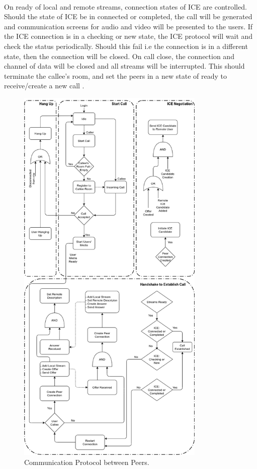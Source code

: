 \\On ready of local and remote streams, connection states of ICE are controlled. Should the state of ICE be in connected or completed, the call will be generated  and communication screens for audio and video will be presented to the users. If the ICE connection is in a checking or new state, the ICE protocol will wait and check the status periodically. Should this fail i.e the connection is in a different state, then the connection will be closed.
On call close, the connection and channel of data will be closed and all streams will be interrupted. This should terminate the callee’s room, and set the peers in a new state of ready to receive/create a new call \cite{14003034520191201}.
\begin{figure}[h!]
    \caption{Communication Protocol between Peers.}
    \label{image:commsProtocol}
    \centering
    \includegraphics[width=0.8\textwidth]{images/CommunicationProtocol.png}
\end{figure}

